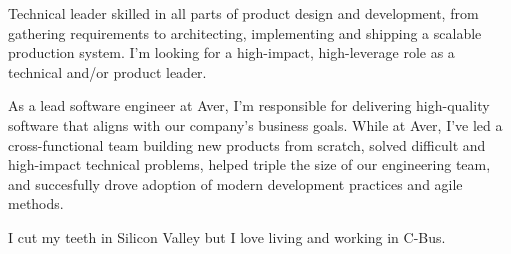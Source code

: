 

\begin{cvparagraph}

Technical leader skilled in all parts of product design and development, from gathering requirements to architecting, implementing and shipping a scalable production system.
I'm looking for a high-impact, high-leverage role as a technical and/or product leader.

As a lead software engineer at Aver, I'm responsible for delivering high-quality software that aligns with our company's business goals.
While at Aver, I've led a cross-functional team building new products from scratch, solved difficult and high-impact technical problems, helped triple the size of our engineering team, and succesfully drove adoption of modern development practices and agile methods.

I cut my teeth in Silicon Valley but I love living and working in C-Bus.

\end{cvparagraph}
